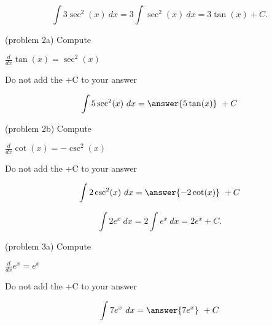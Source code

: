 \documentclass[handout]{ximera}
\begin{document}
\begin{example}[example 2]
\[
\int 3\sec^2(x) \ dx = 3 \int \sec^2(x) \ dx = 3\tan(x) +C.
\]
\end{example}



\begin{problem}(problem 2a)
Compute

\begin{hint}
$\frac{d}{dx} \tan(x) = \sec^2(x)$
\end{hint}
\begin{hint}
\begin{center}
Do not add the +C to your answer
\end{center}
\end{hint}

\[
\int 5\sec^2(x) \ dx =
\answer{5\tan(x)} \ +  C
\]
\end{problem}


\begin{problem}(problem 2b)
Compute

\begin{hint}
$\frac{d}{dx} \cot(x) = -\csc^2(x)$
\end{hint}
\begin{hint}
\begin{center}
Do not add the +C to your answer
\end{center}
\end{hint}

\[
\int 2\csc^2(x) \ dx =
\answer{-2\cot(x)} \ +  C
\]
\end{problem}


\begin{example}[example 3]
\[
\int 2e^x \ dx = 2 \int e^x \ dx = 2e^x +C.
\]
\end{example}


\begin{problem}(problem 3a)
Compute

\begin{hint}
$\frac{d}{dx} e^x = e^x$
\end{hint}
\begin{hint}
\begin{center}
Do not add the +C to your answer
\end{center}
\end{hint}

\[
\int 7e^x \ dx =
\answer{7e^x} \ +  C
\]
\end{problem}
\end{document}
